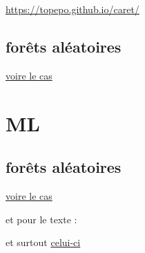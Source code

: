 \documentclass[
]{book}
\begin{document}
\url{https://topepo.github.io/caret/}

\hypertarget{foruxeats-aluxe9atoires}{%
\section{forêts aléatoires}\label{foruxeats-aluxe9atoires}}

\href{http://r.benavent.fr/caret.html}{voire le cas}

\hypertarget{ml}{%
\chapter{ML}\label{ml}}

\hypertarget{foruxeats-aluxe9atoires-1}{%
\section{forêts aléatoires}\label{foruxeats-aluxe9atoires-1}}

\href{http://r.benavent.fr/MM.html}{voire le cas}

et pour le texte :

et surtout \href{https://benaventc.github.io/NLPBook/machine-learning-supervis\%C3\%A9-et-nlp.html}{celui-ci}

  
\end{document}
